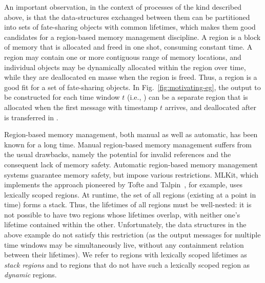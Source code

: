 
An important observation, in the context of processes of the kind
described above, is that the data-structures exchanged between them
can be partitioned into sets of fate-sharing objects with common
lifetimes, which makes them good candidates for a region-based memory
management discipline. A region is a block of memory that is allocated
and freed in one shot, consuming constant time. A region may contain
one or more contiguous range of memory locations, and individual
objects may be dynamically allocated within the region over time,
while they are deallocated en masse when the region is freed.  Thus, a
region is a good fit for a set of fate-sharing objects.
In Fig.~\ref{fig:motivating-eg}, the output to be constructed for each
time window $t$ (i.e., ) can be a separate region that is
allocated when the first message with timestamp $t$ arrives, and
deallocated after  is transferred in .

Region-based memory management, both manual as well as automatic, has
been known for a long time. Manual region-based memory management
suffers from the usual drawbacks, namely the potential for invalid
references and the consequent lack of memory safety. Automatic region-based memory
management systems guarantee memory safety, but impose various
restrictions.  MLKit, which implements the approach pioneered by Tofte
and Talpin~\cite{tofte94,tofte97}, for example, uses lexically scoped
regions.  At runtime, the set of all regions (existing at a point in
time) forms a stack. Thus, the lifetimes of all regions must be
well-nested: it is not possible to have two regions whose lifetimes
overlap, with neither one's lifetime contained within the other.
Unfortunately, the data structures in the above example do not satisfy
this restriction (as the output messages for multiple time windows may
be simultaneously live, without any containment relation between their
lifetimes).  We refer to regions with lexically scoped lifetimes as
\emph{stack regions} and to regions that do not have such a lexically
scoped region as \emph{dynamic} regions.

